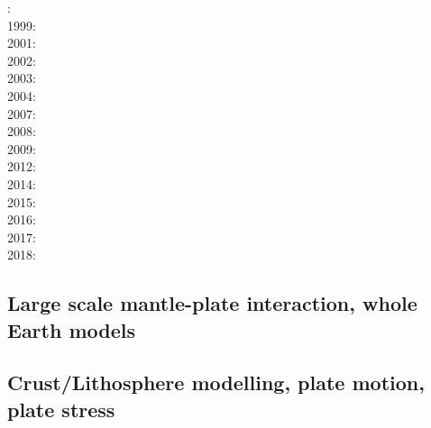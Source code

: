 {\scriptsize
{}: \cite{cava98}\\
1999: \cite{samb99}\cite{samb99b}\\
2001: \cite{bomo01}\cite{kapo01}\\
2002: \cite{shri02}\cite{burb02}\\
2003: \cite{buht03}\\
2004: \cite{isst04}\\
2007: \cite{isks07}\\
2008: \cite{splg08}\cite{ligu08}\\
2009: \cite{wama09}\cite{splg09}\cite{sifg09}\\
2012: \cite{naco12}\\
2014: \cite{wosp14}\cite{hobo14}\cite{licl14}\\
2015: \cite{wahg15}\cite{cobs15}\cite{vybu15}\\
2016: \cite{ghbu16}\cite{bocf16}\cite{yagu16}\cite{baum16}\cite{pric16}\\
2017: \cite{ligs17}\\
2018: \cite{bofc18}\cite{ghbu18}\cite{cogb18}\cite{ghmc18}
}

\subsection{Large scale mantle-plate interaction, whole Earth models}

\cite{yufl85}
\cite{loja95}
\cite{coli06}
\cite{wamg10}\cite{golw00}\cite{stgb10}\cite{cobe10}
\cite{algs12}\cite{roct12}\cite{crtm12}
\cite{ghbh13}\cite{yahb13}
\cite{macs16}
\cite{hulz18}\cite{osss18b}

\subsection{Crust/Lithosphere modelling, plate motion, plate stress}

